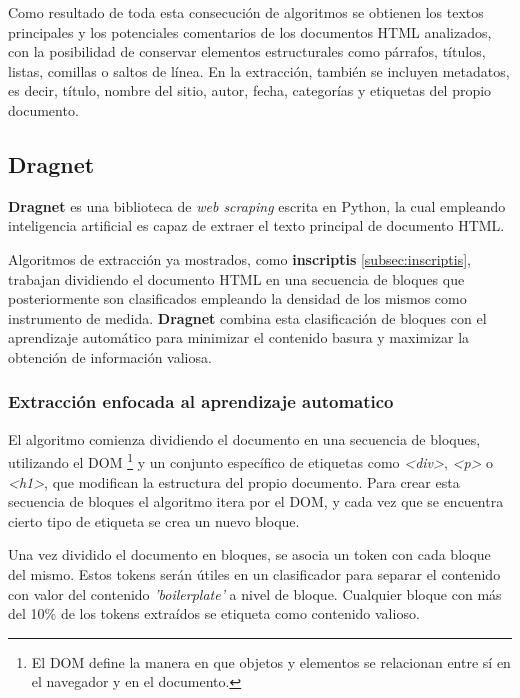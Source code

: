 Como resultado de toda esta consecución de algoritmos se obtienen los textos principales y los potenciales
comentarios de los documentos HTML analizados, con la posibilidad de conservar elementos estructurales como
párrafos, títulos, listas, comillas o saltos de línea. En la extracción, también se incluyen metadatos, 
es decir, título, nombre del sitio, autor, fecha, categorías y etiquetas del propio documento.

\subsection{Dragnet}
\label{subsec:dragnet}

\textbf{Dragnet} \cite{dragnet} es una biblioteca de \emph{web scraping} escrita en Python, la cual empleando 
inteligencia artificial es capaz de extraer el texto principal de documento HTML.

Algoritmos de extracción ya mostrados, como \textbf{inscriptis} \ref{subsec:inscriptis}, trabajan dividiendo 
el documento HTML en una secuencia de bloques que posteriormente son clasificados empleando la densidad de 
los mismos como instrumento de medida. \textbf{Dragnet} combina esta clasificación de bloques con el 
aprendizaje automático para minimizar el contenido basura y maximizar la obtención de información valiosa.

\subsubsection{Extracción enfocada al aprendizaje automatico}
\label{subsubsec:extraccion enfocada al aprendizaje automatico}

El algoritmo comienza dividiendo el documento en una secuencia de bloques, utilizando el DOM \footnote{El 
DOM define la manera en que objetos y elementos se relacionan entre sí en el navegador y en el documento.} 
y un conjunto específico de etiquetas como \emph{<div>}, \emph{<p>} o \emph{<h1>}, que modifican la 
estructura del propio documento. Para crear esta secuencia de bloques el algoritmo itera por el DOM, y cada 
vez que se encuentra cierto tipo de etiqueta se crea un nuevo bloque.

Una vez dividido el documento en bloques, se asocia un token con cada bloque del mismo. Estos tokens serán 
útiles en un clasificador para separar el contenido con valor del contenido \emph{'boilerplate'} a nivel 
de bloque. Cualquier bloque con más del 10\% de los tokens extraídos se etiqueta como contenido valioso.

